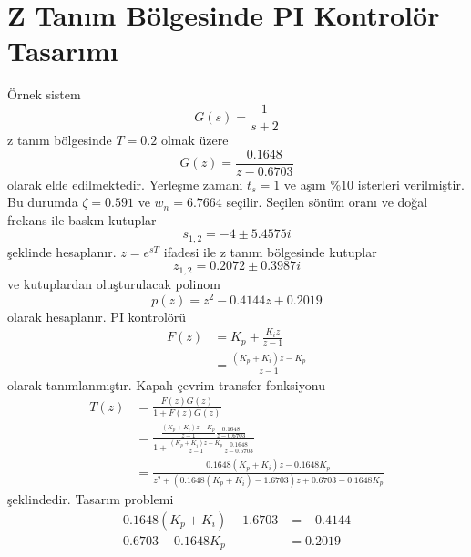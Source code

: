 \chapter{Z Tanım Bölgesinde PI Kontrolör Tasarımı}
Örnek sistem
\begin{equation}
    G(s)=\frac{1}{s+2}
\end{equation}
z tanım bölgesinde $T=0.2$ olmak üzere
\begin{equation}
    G(z)=\frac{0.1648}{z-0.6703}
\end{equation}
olarak elde edilmektedir. Yerleşme zamanı $t_s=1$ ve aşım $\%10$ isterleri verilmiştir. Bu durumda $\zeta=0.591$ ve $w_n=6.7664$ seçilir. Seçilen sönüm oranı ve doğal frekans ile baskın kutuplar
\begin{equation}
    s_{1,2}=-4 \pm 5.4575i
\end{equation}
şeklinde hesaplanır. $z=e^{sT}$ ifadesi ile z tanım bölgesinde kutuplar
\begin{equation}
    z_{1,2}=0.2072 \pm 0.3987i
\end{equation}
ve kutuplardan oluşturulacak polinom
\begin{equation}
    p(z)=z^2-0.4144 z+0.2019
\end{equation}
olarak hesaplanır. PI kontrolörü 
\begin{equation}
\begin{split}
    F(z)&=K_p+\frac{K_iz}{z-1}\\
    &=\frac{(K_p+K_i)z-K_p}{z-1}
\end{split}
\end{equation}
olarak tanımlanmıştır. Kapalı çevrim transfer fonksiyonu 
\begin{equation}
    \begin{split}
        T(z)&=\frac{F(z)G(z)}{1+F(z)G(z)}\\
        &=\frac{\frac{(K_p+K_i)z-K_p}{z-1}\frac{0.1648}{z-0.6703}}{1+\frac{(K_p+K_i)z-K_p}{z-1}\frac{0.1648}{z-0.6703}}\\
        &=\frac{0.1648(K_p+K_i)z-0.1648K_p}{z^2+(0.1648(K_p+K_i)-1.6703)z+0.6703-0.1648K_p}
    \end{split}
\end{equation}
şeklindedir. Tasarım problemi
\begin{equation}
    \begin{split}
       0.1648(K_p+K_i)-1.6703&=-0.4144\\
       0.6703-0.1648K_p&=0.2019
    \end{split}
\end{equation}

